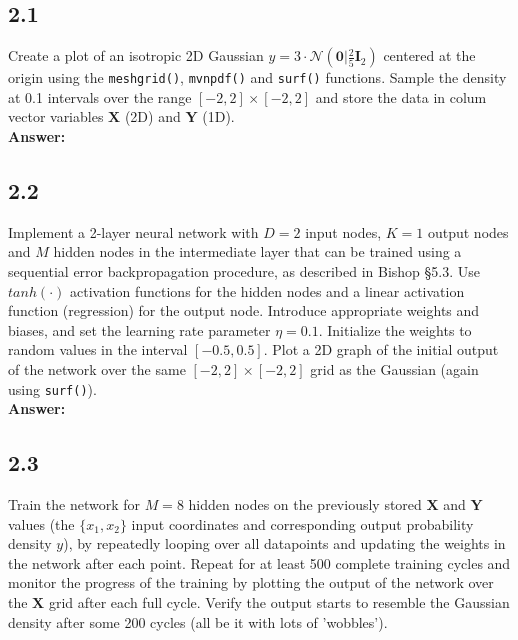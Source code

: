 \documentclass[a4paper]{article}
\begin{document}
\subsection*{2.1}

Create a plot of an isotropic 2D Gaussian $y = 3 \cdot \mathcal{N}(\textbf{0}|\frac{2}{5}\textbf{I}_2)$ centered at the origin using the \texttt{meshgrid()}, \texttt{mvnpdf()} and \texttt{surf()} functions. Sample the density at 0.1 intervals over the range $[-2,2] \times [-2,2]$ and store the data in colum vector variables $\textbf{X}$ (2D) and $\textbf{Y}$ (1D).\\

\textbf{Answer:}\\







\subsection*{2.2}

Implement a 2-layer neural network with $D = 2$ input nodes, $K = 1$ output nodes and $M$ hidden nodes in the intermediate layer that can be trained using a sequential error backpropagation procedure, as described in Bishop §5.3. Use $tanh(\cdot)$ activation functions for the hidden nodes and a linear activation function (regression) for the output node. Introduce appropriate weights and biases, and set the learning rate parameter $\eta = 0.1$. Initialize the weights to random values in the interval $[-0.5,0.5]$. Plot a 2D graph of the initial output of the network over the same $[-2,2] \times [-2,2]$ grid as the Gaussian (again using \texttt{surf()}).\\

\textbf{Answer:}\\









\subsection*{2.3}

Train the network for $M = 8$ hidden nodes on the previously stored $\textbf{X}$ and $\textbf{Y}$ values (the $\{ x_1, x_2 \}$ input coordinates and corresponding output probability density $y$), by repeatedly looping over all datapoints and updating the weights in the network after each point. Repeat for at least 500 complete training cycles and monitor the progress of the training by plotting the output of the network over the $\textbf{X}$ grid after each full cycle. Verify the output starts to resemble the Gaussian density after some 200 cycles (all be it with lots of 'wobbles').\\
\end{document}
